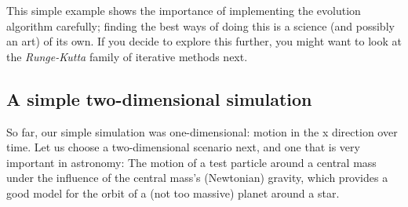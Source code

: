 \documentclass[twocolumn,apj]{openjournal}
\begin{document}
This simple example shows the importance of implementing the evolution algorithm carefully; finding the best ways of doing this is a science (and possibly an art) of its own. If you decide to explore this further, you might want to look at the {\em Runge-Kutta} family of iterative methods next.

\subsection{A simple two-dimensional simulation}
\label{2D}

So far, our simple simulation was one-dimensional: motion in the x direction over time. Let us choose a two-dimensional scenario next, and one that is very important in astronomy: The motion of a test particle around a central mass under the influence of the central mass's (Newtonian) gravity, which provides a good model for the orbit of a (not too massive) planet around a star.
\end{document}
